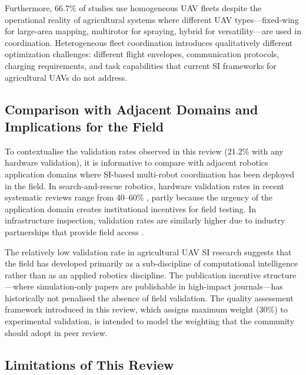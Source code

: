 \documentclass[review,3p,times]{elsarticle}
\begin{document}
Furthermore, 66.7\% of studies use homogeneous UAV fleets despite the operational reality of agricultural systems where different UAV types---fixed-wing for large-area mapping, multirotor for spraying, hybrid for versatility---are used in coordination. Heterogeneous fleet coordination introduces qualitatively different optimization challenges: different flight envelopes, communication protocols, charging requirements, and task capabilities that current SI frameworks for agricultural UAVs do not address.

\subsection{Comparison with Adjacent Domains and Implications for the Field}
\label{sec:comparison}

To contextualise the validation rates observed in this review (21.2\% with any hardware validation), it is informative to compare with adjacent robotics application domains where SI-based multi-robot coordination has been deployed in the field. In search-and-rescue robotics, hardware validation rates in recent systematic reviews range from 40--60\% \cite{chung2018}, partly because the urgency of the application domain creates institutional incentives for field testing. In infrastructure inspection, validation rates are similarly higher due to industry partnerships that provide field access \cite{brambilla2013}.

The relatively low validation rate in agricultural UAV SI research suggests that the field has developed primarily as a sub-discipline of computational intelligence rather than as an applied robotics discipline. The publication incentive structure---where simulation-only papers are publishable in high-impact journals---has historically not penalised the absence of field validation. The quality assessment framework introduced in this review, which assigns maximum weight (30\%) to experimental validation, is intended to model the weighting that the community should adopt in peer review.

\subsection{Limitations of This Review}
\label{sec:limitations_discussion}
\end{document}

